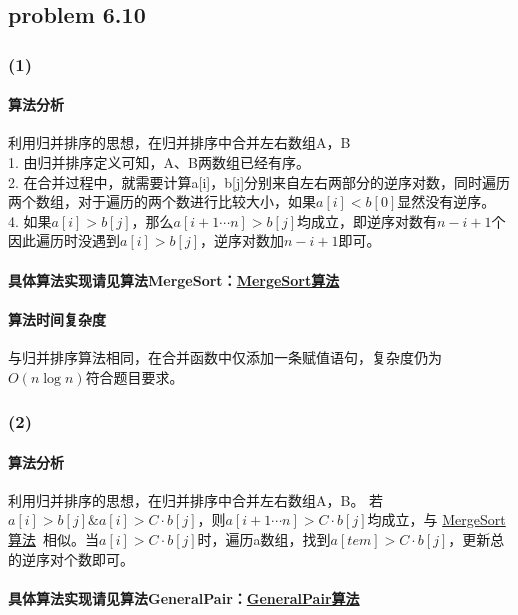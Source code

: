 \documentclass[11pt]{ctexart}
\begin{document}
	\subsection*{problem 6.10}
	\subsubsection*{(1)}
	\paragraph{算法分析}利用归并排序的思想，在归并排序中合并左右数组A，B\\
	\hspace*{20pt}1. 由归并排序定义可知，A、B两数组已经有序。\\
	\hspace*{20pt}2. 在合并过程中，就需要计算a[i]，b[j]分别来自左右两部分的逆序对数，同时遍历两个数组，对于遍历的两个数进行比较大小，如果$a[i]<b[0]$显然没有逆序。\\
	\hspace*{20pt}4. 如果$a[i]>b[j]$，那么$a[i+1\cdots n]>b[j]$均成立，即逆序对数有$n-i+1$个
	因此遍历时没遇到$a[i]>b[j]$，逆序对数加$n-i+1$即可。
	\paragraph{具体算法实现请见算法MergeSort：\hyperref[MergeSort算法]{MergeSort算法}}
	\paragraph{算法时间复杂度}与归并排序算法相同，在合并函数中仅添加一条赋值语句，复杂度仍为$O(n\log n)$符合题目要求。
	\subsubsection*{(2)}
	\paragraph{算法分析}
	利用归并排序的思想，在归并排序中合并左右数组A，B。
	若$a[i]>b[j]\&a[i]>C\cdot b[j]$，则$a[i+1\cdots n]>C\cdot b[j]$均成立，与 \hyperref[MergeSort算法]{MergeSort算法}\ 相似。当$a[i]>C\cdot b[j]$时，遍历a数组，找到$a[tem]>C\cdot b[j]$，更新总的逆序对个数即可。
	\paragraph{具体算法实现请见算法GeneralPair：\hyperref[GeneralPair算法]{GeneralPair算法}}
\end{document}

